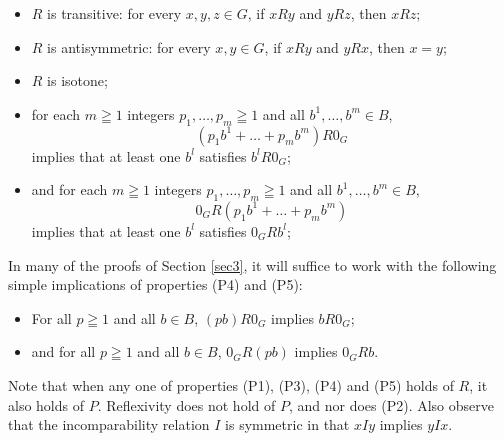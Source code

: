 \documentclass[pdflatex,sn-apa,11pt]{sn-jnl}%
\begin{document}
\begin{itemize}
\item[(P1)] $R$ is transitive: for every $x, y, z \in G$, if $xRy$ and $yRz$, then $xRz$;
\item[(P2)] $R$ is antisymmetric: for every $x, y \in G$, if $xRy$ and $yRx$, then $x = y$;
\item[(P3)] $R$ is isotone;
\item[(P4)] for each $m \geqq 1$ integers $p_1, \dots, p_m \geqq 1$ and all $b^1, \dots, b^m \in B$, \begin{equation*}(p_1b^1 + \dots + p_mb^{m})R0_{G}\end{equation*} implies that at least one $b^l$ satisfies $b^lR0_{G}$;
\item[(P5)] and for each $m \geqq 1$ integers $p_1, \dots, p_m \geqq 1$ and all $b^1, \dots, b^m \in B$, \begin{equation*}0_{G}R(p_1b^1 + \dots + p_mb^{m})\end{equation*} implies that at least one $b^l$ satisfies $0_{G}Rb^l$;
\end{itemize}

In many of the proofs of Section \ref{sec3}, it will suffice to work with the following simple implications of properties (P4) and (P5):
\begin{itemize}
\item[(P4')] For all $p \geqq 1$ and all $b \in B$, $(pb)R0_{G}$ implies $bR0_{G}$;
\item[(P5')] and for all $p \geqq 1$ and all $b \in B$, $0_{G}R(pb)$ implies $0_{G}Rb$.
\end{itemize}

Note that when any one of properties (P1), (P3), (P4) and (P5) holds of $R$, it also holds of $P$. Reflexivity does not hold of $P$, and nor does (P2). Also observe that the incomparability relation $I$ is symmetric in that $xIy$ implies $yIx$. 
\end{document}
